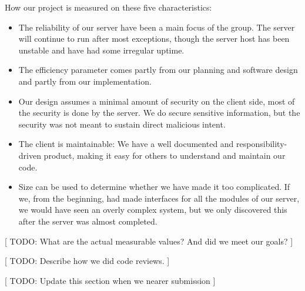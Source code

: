 How our project is measured on these five characteristics:
\begin{itemize}
 	\item The reliability of our server have been a main focus of the group. The server will continue to run after most exceptions, though the server host has been unstable and have had some irregular uptime.
 	\item The efficiency parameter comes partly from our planning and software design and partly from our implementation.
 	\item Our design assumes a minimal amount of security on the client side, most of the security is done by the server. We do secure sensitive information, but the security was not meant to sustain direct malicious intent.
 	\item The client is maintainable: We have a well documented and responsibility-driven product, making it easy for others to understand and maintain our code. 
	\item Size can be used to determine whether we have made it too complicated. If we, from the beginning, had made interfaces for all the modules of our server, we would have seen an overly complex system, but we only discovered this after the server was almost completed. 
\end{itemize}

[ TODO: What are the actual measurable values? And did we meet our goals? ]

[ TODO: Describe how we did code reviews. ]

[ TODO: Update this section when we nearer submission ]